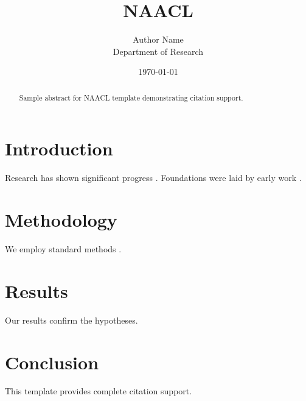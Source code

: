 \documentclass{article}
\title{NAACL}
\author{Author Name \\ \small Department of Research}
\date{\today}
\begin{document}
\maketitle

\begin{abstract}
Sample abstract for NAACL template demonstrating citation support.
\end{abstract}

\section{Introduction}
Research has shown significant progress \citep{einstein1905}. Foundations were laid by early work \citep{turing1950}.

\section{Methodology}
We employ standard methods \citep{knuth1984}.

\section{Results}
Our results confirm the hypotheses.

\section{Conclusion}
This template provides complete citation support.



\end{document}
